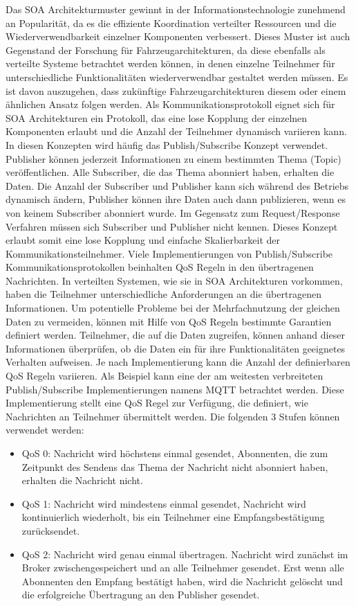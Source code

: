 Das \gls{SOA} Architekturmuster gewinnt in der Informationstechnologie zunehmend an Popularität, da es die effiziente Koordination verteilter Ressourcen und die Wiederverwendbarkeit einzelner Komponenten verbessert. Dieses Muster ist auch Gegenstand der Forschung für Fahrzeugarchitekturen, da diese ebenfalls als verteilte Systeme betrachtet werden können, in denen einzelne Teilnehmer für unterschiedliche Funktionalitäten wiederverwendbar gestaltet werden müssen. Es ist davon auszugehen, dass zukünftige Fahrzeugarchitekturen diesem oder einem ähnlichen Ansatz folgen werden. Als Kommunikationsprotokoll eignet sich für \gls{SOA} Architekturen ein Protokoll, das eine lose Kopplung der einzelnen Komponenten erlaubt und die Anzahl der Teilnehmer dynamisch variieren kann. In diesen Konzepten wird häufig das Publish/Subscribe Konzept verwendet. Publisher können jederzeit Informationen zu einem bestimmten Thema (Topic) veröffentlichen. Alle Subscriber, die das Thema abonniert haben, erhalten die Daten. Die Anzahl der Subscriber und Publisher kann sich während des Betriebs dynamisch ändern, Publisher können ihre Daten auch dann publizieren, wenn es von keinem Subscriber abonniert wurde. Im Gegensatz zum Request/Response Verfahren müssen sich Subscriber und Publisher nicht kennen. Dieses Konzept erlaubt somit eine lose Kopplung und einfache Skalierbarkeit der Kommunikationsteilnehmer. Viele Implementierungen von Publish/Subscribe Kommunikationsprotokollen beinhalten \gls{QoS} Regeln in den übertragenen Nachrichten. In verteilten Systemen, wie sie in \gls{SOA} Architekturen vorkommen, haben die Teilnehmer unterschiedliche Anforderungen an die übertragenen Informationen. Um potentielle Probleme bei der Mehrfachnutzung der gleichen Daten zu vermeiden, können mit Hilfe von \gls{QoS} Regeln bestimmte Garantien definiert werden. Teilnehmer, die auf die Daten zugreifen, können anhand dieser Informationen überprüfen, ob die Daten ein für ihre Funktionalitäten geeignetes Verhalten aufweisen. Je nach Implementierung kann die Anzahl der definierbaren \gls{QoS} Regeln variieren. Als Beispiel kann eine der am weitesten verbreiteten Publish/Subscribe Implementierungen namens \gls{MQTT} betrachtet werden. Diese Implementierung stellt eine \gls{QoS} Regel zur Verfügung, die definiert, wie Nachrichten an Teilnehmer übermittelt werden. Die folgenden 3 Stufen können verwendet werden:

\begin{itemize}
    \item \gls{QoS} 0: Nachricht wird höchstens einmal gesendet, Abonnenten, die zum Zeitpunkt des Sendens das Thema der Nachricht nicht abonniert haben, erhalten die Nachricht nicht.
    \item \gls{QoS} 1: Nachricht wird mindestens einmal gesendet, Nachricht wird kontinuierlich wiederholt, bis ein Teilnehmer eine Empfangsbestätigung zurücksendet.
    \item \gls{QoS} 2: Nachricht wird genau einmal übertragen. Nachricht wird zunächst im Broker zwischengespeichert und an alle Teilnehmer gesendet. Erst wenn alle Abonnenten den Empfang bestätigt haben, wird die Nachricht gelöscht und die erfolgreiche Übertragung an den Publisher gesendet. 
\end{itemize}

